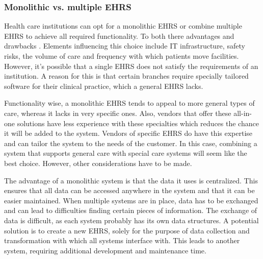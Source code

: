        \subsubsection{Monolithic vs. multiple EHRS} \label{ehrs_comparison}

        Health care institutions can opt for a monolithic EHRS or combine multiple EHRS to achieve all required functionality. To both there advantages and drawbacks \cite{multiple_ehrs}. Elements influencing this choice include IT infrastructure, safety risks, the volume of care and frequency with which patients move facilities. However, it's possible that a single EHRS does not satisfy the requirements of an institution. A reason for this is that certain branches require specially tailored software for their clinical practice, which a general EHRS lacks. 

        Functionality wise, a monolithic EHRS tends to appeal to more general types of care, whereas it lacks in very specific ones. Also, vendors that offer these all-in-one solutions have less experience with these specialties which reduces the chance it will be added to the system. Vendors of specific EHRS do have this expertise and can tailor the system to the needs of the customer. In this case, combining a system that supports general care with special care systems will seem like the best choice. However, other considerations have to be made.

        The advantage of a monolithic system is that the data it uses is centralized. This ensures that all data can be accessed anywhere in the system and that it can be easier maintained. When multiple systems are in place, data has to be exchanged and can lead to difficulties finding certain pieces of information. The exchange of data is difficult, as each system probably has its own data structures. A potential solution is to create a new EHRS, solely for the purpose of data collection and transformation with which all systems interface with. This leads to another system, requiring additional development and maintenance time.
    
